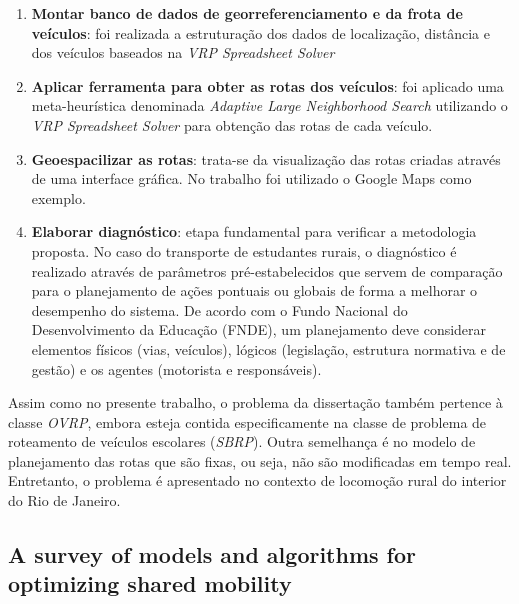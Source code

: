 \begin{enumerate}
    \item \textbf{Montar banco de dados de georreferenciamento e da frota de veículos}: foi realizada a estruturação dos dados de localização, distância e dos veículos baseados na \emph{VRP Spreadsheet Solver}
    
    \item \textbf{Aplicar ferramenta para obter as rotas dos veículos}: foi aplicado uma meta-heurística denominada \emph{Adaptive Large Neighborhood Search} utilizando o \emph{VRP Spreadsheet Solver} para obtenção das rotas de cada veículo.    
    
    \item \textbf{Geoespacilizar as rotas}: trata-se da visualização das rotas criadas através de uma interface gráfica. No trabalho foi utilizado o Google Maps como exemplo.
    
    \item \textbf{Elaborar diagnóstico}: etapa fundamental para verificar a metodologia proposta. No caso do transporte de estudantes rurais, o diagnóstico é realizado através de parâmetros pré-estabelecidos que servem de comparação para o planejamento de ações pontuais ou globais de forma a melhorar o desempenho do sistema. De acordo com o Fundo Nacional do Desenvolvimento da Educação (FNDE), um planejamento deve considerar elementos físicos (vias, veículos), lógicos (legislação, estrutura normativa e de gestão) e os agentes (motorista e responsáveis). 
\end{enumerate}

Assim como no presente trabalho, o problema da dissertação também pertence à classe \emph{OVRP}, embora esteja contida especificamente na classe de problema de roteamento de veículos escolares (\emph{SBRP}). Outra semelhança é no modelo de planejamento das rotas que são fixas, ou seja, não são modificadas em tempo real. Entretanto, o problema é apresentado no contexto de locomoção rural do interior do Rio de Janeiro.


\subsection{A survey of models and algorithms for optimizing shared mobility \cite{MOURAD2019323}}

